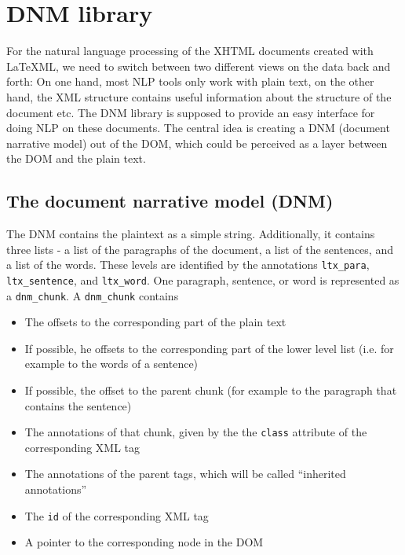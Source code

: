 \documentclass[12pt]{article}
\begin{document}
\section{DNM library}
For the natural language processing of the XHTML documents created with LaTeXML,
we need to switch between two different views on the data back and forth:
On one hand, most NLP tools only work with plain text,
on the other hand, the XML structure contains useful information about the structure
of the document etc.
The DNM library is supposed to provide an easy interface
for doing NLP on these documents.
The central idea is creating a DNM (document narrative model) out of the DOM,
which could be perceived as a layer between the DOM and the plain text.

\subsection{The document narrative model (DNM)}
The DNM contains the plaintext as a simple string.
Additionally, it contains three lists - a list of the paragraphs of the document,
a list of the sentences, and a list of the words.
These levels are identified by the annotations \texttt{ltx\_para}, \texttt{ltx\_sentence},
and \texttt{ltx\_word}.
One paragraph, sentence, or word is represented as a \texttt{dnm\_chunk}.
A \texttt{dnm\_chunk} contains
\begin{itemize}
\item The offsets to the corresponding part of the plain text
\item If possible, he offsets to the corresponding part of the lower level list
(i.e. for example to the words of a sentence)
\item If possible, the offset to the parent chunk (for example to the paragraph that contains the sentence)
\item The annotations of that chunk, given by the the \texttt{class} attribute of the
corresponding XML tag
\item The annotations of the parent tags, which will be called ``inherited annotations''
\item The \texttt{id} of the corresponding XML tag
\item A pointer to the corresponding node in the DOM
\end{itemize}
\end{document}

